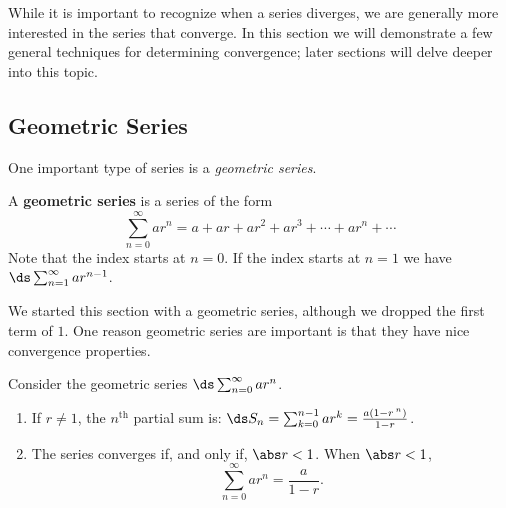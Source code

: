 While it is important to recognize when a series diverges, we are generally more interested in the series that  converge. In this section we will demonstrate a few general techniques for determining convergence; later sections will delve deeper into this topic.

\subsection{Geometric Series}

One important type of series is a \emph{geometric series}.

\begin{definition}\label{def:geom_series}
A \textbf{geometric series} is a series of the form 
\[\sum_{n=0}^\infty ar^n = a+ar+ar^2+ar^3+\dotsb+ar^n+\dotsb\]
Note that the index starts at $n=0$. If the index starts at $n=1$ we have $\ds \sum_{n=1}^\infty ar^{n-1}$.%
\end{definition}

We started this section with a geometric series, although we dropped the first term of $1$. One reason geometric series are important is that they have nice convergence properties.

\begin{theorem}\label{thm:geom_series}
Consider the geometric series $\ds \sum_{n=0}^\infty ar^n$.\vspace{-.5\baselineskip}
\begin{enumerate}
\item	If $r\neq1$, the $n^\text{th}$ partial sum is: $\ds S_n = \sum_{k=0}^{n-1}ar^k=\frac{a(1-r\,^n)}{1-r}$.
\item	The series converges if, and only if, $\abs r<1$. When $\abs r<1$, 
\[\sum_{n=0}^\infty ar^n = \frac{a}{1-r}.\]
\end{enumerate}
\end{theorem}

